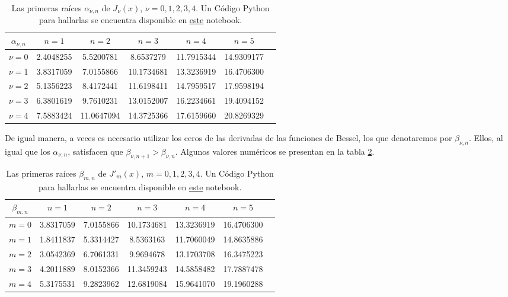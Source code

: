 \begin{table}[htbp]
    \centering
    \begin{tabular}{ccccccc}
    \hline $\alpha_{\nu,n}$ & $n=1$ & $n=2$ & $n=3$ & $n=4$ & $n=5$ \\ \hline 
    $\nu=0$ & 2.4048255 &  5.5200781 &  8.6537279 & 11.7915344 & 14.9309177\\
    $\nu=1$ & 3.8317059 &  7.0155866 & 10.1734681 & 13.3236919 & 16.4706300\\
    $\nu=2$ & 5.1356223 &  8.4172441 & 11.6198411 & 14.7959517 & 17.9598194 \\
    $\nu=3$ & 6.3801619 &  9.7610231 & 13.0152007 & 16.2234661 & 19.4094152 \\
    $\nu=4$ & 7.5883424 & 11.0647094 & 14.3725366 & 17.6159660 & 20.8269329 \\
    \hline 
    \end{tabular} 
    \caption{Las primeras raíces $\alpha_{\nu,n}$ de $J_\nu(x)$, $\nu=0,1,2,3,4$. Un Código Python para hallarlas se encuentra disponible en \href{https://github.com/gfrubi/FM2/blob/master/Notebooks/Bessel-Ceros.ipynb}{este} notebook.}
    \label{tab:alphanun}
\end{table}

De igual manera, a veces es necesario utilizar los ceros de las derivadas de las funciones de Bessel, los que denotaremos por $\beta_{\nu, n}$. Ellos, al igual que los $\alpha_{\nu, n}$, satisfacen que $\beta_{\nu, n+1} > \beta_{\nu, n}$. Algunos valores numéricos se presentan en la tabla \ref{tab:betanun}.

\begin{table}[htbp]
    \centering
    \begin{tabular}{ccccccc}
    \hline $\beta_{m,n}$ & $n=1$ & $n=2$ & $n=3$ & $n=4$ & $n=5$ \\ \hline 
    $m=0$ & 3.8317059 &  7.0155866 & 10.1734681 & 13.3236919 & 16.4706300\\
    $m=1$ & 1.8411837 &  5.3314427 &  8.5363163 & 11.7060049 & 14.8635886 \\
    $m=2$ & 3.0542369 &  6.7061331 &  9.9694678 & 13.1703708 & 16.3475223 \\
    $m=3$ & 4.2011889 &  8.0152366 & 11.3459243 & 14.5858482 & 17.7887478 \\
    $m=4$ & 5.3175531 &  9.2823962 & 12.6819084 & 15.9641070 & 19.1960288 \\
    \hline 
    \end{tabular} 
    \caption{Las primeras raíces $\beta_{m,n}$ de $J'_m(x)$, $m=0,1,2,3,4$. Un Código Python para hallarlas se encuentra disponible en \href{https://github.com/gfrubi/FM2/blob/master/Notebooks/Bessel-Ceros.ipynb}{este} notebook.}
    \label{tab:betanun}
\end{table}


